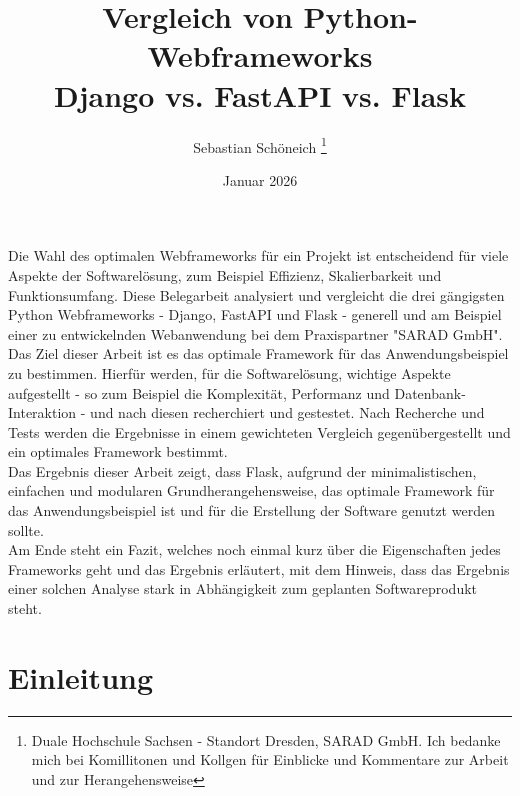 \documentclass[letterpaper,11pt,leqno]{article}
\begin{document}
\title{Vergleich von Python-Webframeworks\\Django vs. FastAPI vs. Flask}
\author{Sebastian Schöneich
\thanks{Duale Hochschule Sachsen - Standort Dresden, SARAD GmbH. Ich bedanke mich bei Komillitonen und Kollgen für Einblicke und
Kommentare zur Arbeit und zur Herangehensweise}}
\date{Januar 2026}   
\begin{titlepage}
\maketitle
Die Wahl des optimalen Webframeworks für ein Projekt ist entscheidend für viele Aspekte der Softwarelösung, zum Beispiel Effizienz,
Skalierbarkeit und Funktionsumfang. Diese Belegarbeit analysiert und vergleicht die drei gängigsten Python Webframeworks - Django,
FastAPI und Flask - generell und am Beispiel einer zu entwickelnden Webanwendung bei dem Praxispartner "SARAD GmbH".\\Das Ziel
dieser Arbeit ist es das optimale Framework für das Anwendungsbeispiel zu bestimmen. Hierfür werden, für die Softwarelösung,
wichtige Aspekte aufgestellt - so zum Beispiel die Komplexität, Performanz und Datenbank-Interaktion - und nach diesen recherchiert
und gestestet. Nach Recherche und Tests werden die Ergebnisse in einem gewichteten Vergleich gegenübergestellt und ein optimales
Framework bestimmt.\\Das Ergebnis dieser Arbeit zeigt, dass Flask, aufgrund der minimalistischen, einfachen und modularen
Grundherangehensweise, das optimale Framework für das Anwendungsbeispiel ist und für die Erstellung der Software genutzt werden
sollte.\\ Am Ende steht ein Fazit, welches noch einmal kurz über die Eigenschaften jedes Frameworks geht und das Ergebnis erläutert,
mit dem Hinweis, dass das Ergebnis einer solchen Analyse stark in Abhängigkeit zum geplanten Softwareprodukt steht.

\clearpage
\tableofcontents
\end{titlepage}

\section{Einleitung}\label{s:einleitung}
\end{document}

